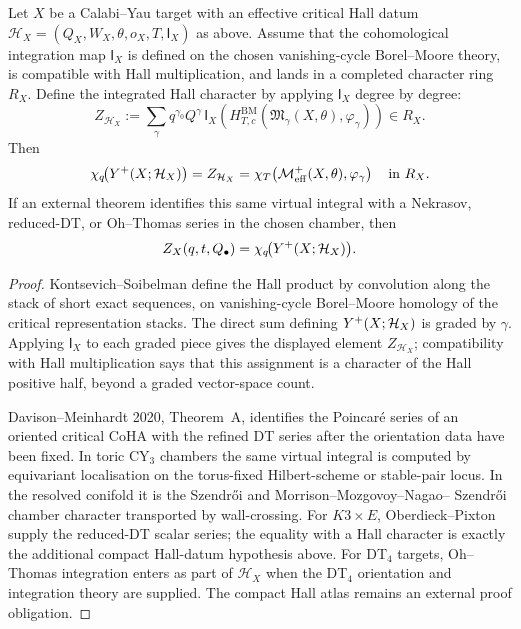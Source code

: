 \begin{theorem}
\label{wn:thm:nek-char-hall-data}
Let $X$ be a Calabi--Yau target with an effective critical Hall datum
$\mathcal H_X=(Q_X,W_X,\theta,o_X,T,\mathsf I_X)$ as above. Assume
that the cohomological integration map \(\mathsf I_X\) is defined on
the chosen vanishing-cycle Borel--Moore theory, is compatible with Hall
multiplication, and lands in a completed character ring \(R_X\). Define
the integrated Hall character by applying \(\mathsf I_X\) degree by
degree:
\[
  Z_{\mathcal H_X}
  :=
  \sum_\gamma q^{\gamma_0}Q^\gamma\,
  \mathsf I_X\!\left(
    H^{\mathrm{BM}}_{T,c}
    (\mathfrak M_\gamma(X,\theta),\varphi_\gamma)
  \right)
  \in R_X .
\]
Then
\[
  \chi_q\!\bigl(Y^{+}(X;\mathcal H_X)\bigr)
  =
  Z_{\mathcal H_X}
  =
  \chi_T\!\left(\mathcal{M}^{+}_{\mathrm{eff}}(X,\theta),\varphi_{\gamma}\right)
  \quad\text{in }R_X.
\]
If an external theorem identifies this same virtual integral with a
Nekrasov, reduced-DT, or Oh--Thomas series in the chosen chamber, then
\[
  Z_X(q,t,Q_\bullet)=\chi_q\!\bigl(Y^{+}(X;\mathcal H_X)\bigr).
\]
\end{theorem}

\begin{proof}
Kontsevich--Soibelman define the Hall product by convolution along
the stack of short exact sequences, on vanishing-cycle
Borel--Moore homology of the critical representation stacks.
The direct sum defining \(Y^{+}(X;\mathcal H_X)\) is graded by
\(\gamma\). Applying \(\mathsf I_X\) to each graded piece gives the
displayed element \(Z_{\mathcal H_X}\); compatibility with Hall
multiplication says that this assignment is a character of the Hall
positive half, beyond a graded vector-space count.

Davison--Meinhardt 2020, Theorem~A, identifies the Poincar\'e series
of an oriented critical CoHA with the refined DT series after the
orientation data have been fixed. In toric CY$_3$ chambers the same
virtual integral is computed by equivariant localisation on the
torus-fixed Hilbert-scheme or stable-pair locus. In the resolved
conifold it is the Szendr\H{o}i and Morrison--Mozgovoy--Nagao--
Szendr\H{o}i chamber character transported by wall-crossing. For
\(K3\times E\), Oberdieck--Pixton supply the reduced-DT scalar series;
the equality with a Hall character is exactly the additional compact
Hall-datum hypothesis above. For DT$_4$ targets, Oh--Thomas integration
enters as part of \(\mathcal H_X\) when the DT$_4$ orientation and
integration theory are supplied. The compact Hall atlas remains an
external proof obligation.
\end{proof}


